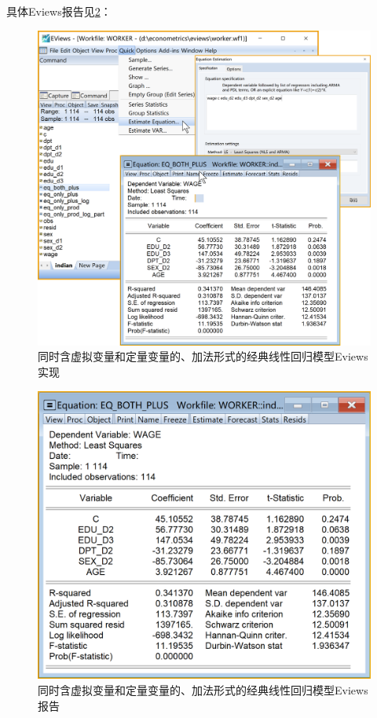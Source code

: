 \documentclass[12pt,(landscape,a4paper),(portrait,a4paper)]{article}
\theoremstyle{definition}
\theoremstyle{definition}
\theoremstyle{definition}
\theoremstyle{remark}
\begin{document}
具体Eviews报告见\ref{fig:both-plus-report}：

\begin{figure}

{\centering \includegraphics[width=27.75in]{picture/lab8-dummy-model/3-both-plus} 

}

\caption{同时含虚拟变量和定量变量的、加法形式的经典线性回归模型Eviews实现}\label{fig:both-plus}
\end{figure}

\begin{figure}

{\centering \includegraphics[width=18.36in]{picture/lab8-dummy-model/3-both-plus-report} 

}

\caption{同时含虚拟变量和定量变量的、加法形式的经典线性回归模型Eviews报告}\label{fig:both-plus-report}
\end{figure}
\end{document}
